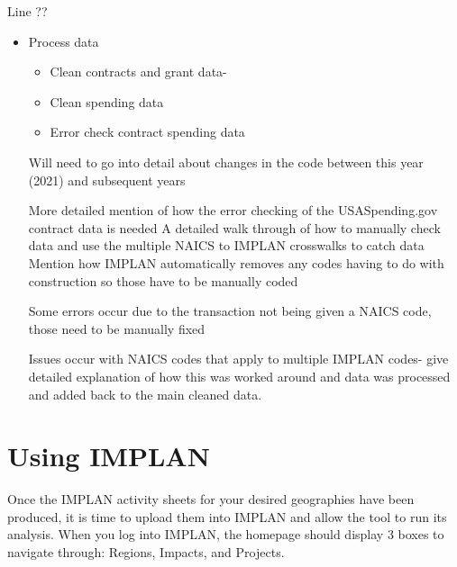 \documentclass[
]{book}
\providecommand{\tightlist}{%
  \setlength{\itemsep}{0pt}\setlength{\parskip}{0pt}}
\begin{document}
Line ??

\begin{itemize}
\item
  Process data

  \begin{itemize}
  \tightlist
  \item
    Clean contracts and grant data-
  \item
    Clean spending data
  \item
    Error check contract spending data
  \end{itemize}

  Will need to go into detail about changes in the code between this year (2021) and subsequent years

  More detailed mention of how the error checking of the USASpending.gov contract data is needed
  A detailed walk through of how to manually check data and use the multiple NAICS to IMPLAN crosswalks to catch data
  Mention how IMPLAN automatically removes any codes having to do with construction so those have to be manually coded

  Some errors occur due to the transaction not being given a NAICS code, those need to be manually fixed

  Issues occur with NAICS codes that apply to multiple IMPLAN codes- give detailed explanation of how this was worked around and data was processed and added back to the main cleaned data.
\end{itemize}

\hypertarget{using-implan}{%
\chapter{Using IMPLAN}\label{using-implan}}

Once the IMPLAN activity sheets for your desired geographies have been produced, it is time to upload them into IMPLAN and allow the tool to run its analysis. When you log into IMPLAN, the homepage should display 3 boxes to navigate through: Regions, Impacts, and Projects.
\end{document}
